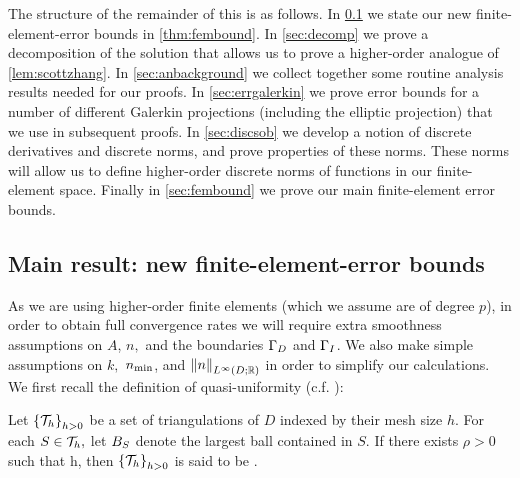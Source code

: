 The structure of the remainder of this  is as follows. In \cref{sec:errbounds} we state our new finite-element-error bounds in \cref{thm:fembound}. In \cref{sec:decomp} we prove a decomposition of the solution that allows us to prove a higher-order analogue of \cref{lem:scottzhang}. In \cref{sec:anbackground} we collect together some routine analysis results needed for our proofs. In \cref{sec:errgalerkin} we prove error bounds for a number of different Galerkin projections (including the elliptic projection) that we use in subsequent proofs. In \cref{sec:discsob} we develop a notion of discrete derivatives and discrete norms, and prove properties of these norms. These norms will allow us to define higher-order discrete norms of functions in our finite-element space. Finally in \cref{sec:fembound} we prove our main finite-element error bounds.



\subsection{Main result: new finite-element-error bounds}\label{sec:errbounds}
As we are using higher-order finite elements (which we assume are of degree $p$), in order to obtain full convergence rates we will require extra smoothness assumptions on $A$, $n,$ and the boundaries $\Gamma_{D}$ and $\Gamma_{I}$. We also make simple assumptions on $k,$ $n_{\min}$, and $\NLiDRR{n}$ in order to simplify our calculations. We first recall the definition of quasi-uniformity (c.f. \cite[Definition 4.4.13]{BrSc:08}):

\label{def:quasiuniform}
Let $\set{\cTh}_{h>0}$ be a set of triangulations of $D$ indexed by their mesh size $h.$ For each $S \in \mathcal T_{h},$ let $B_{S}$ denote the largest ball contained in $S$.
If there exists $\rho > 0$ such that 
\beqs
\min{} \geq \rho h,
\eeqs
then $\set{\cTh}_{h>0}$ is said to be .
\ede


